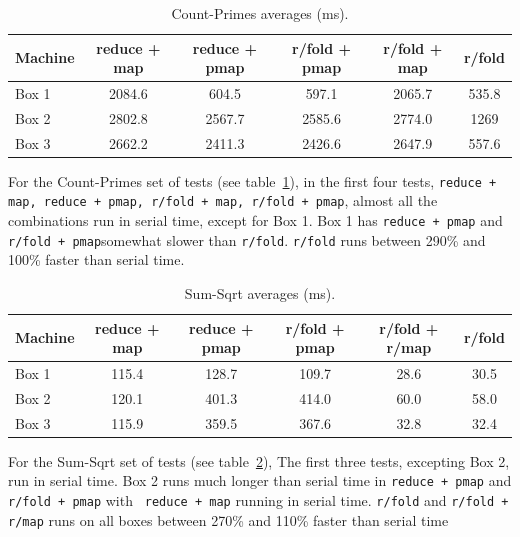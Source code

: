 \documentclass[12pt]{article}
\newcommand{\clocode}[1]{{\texttt {#1}}}
\begin{document}
\begin{table}[h!]
\begin{center}
\begin{tabular}{|l|c|c|c|c|c|}
\hline
Machine & reduce + map & reduce + pmap & r/fold + pmap & r/fold + map & r/fold\\
\hline
Box 1 & 2084.6 & 604.5 & 597.1 & 2065.7 & 535.8\\
Box 2 & 2802.8 & 2567.7 & 2585.6 & 2774.0 & 1269 \\
Box 3 & 2662.2 & 2411.3 & 2426.6 & 2647.9 & 557.6\\
\hline
\end{tabular}
\end{center}
\caption{Count-Primes averages (ms).}\label{table:count-primes}
\end{table}

For the Count-Primes set of tests (see table~\ref{table:count-primes}), in the first four tests, \clocode{reduce + map, reduce + pmap, r/fold + map, r/fold + pmap}, almost all the combinations run in serial time, except for Box 1. Box 1 has \clocode{reduce + pmap} and \clocode{r/fold + pmap}somewhat slower than \clocode{r/fold}. \clocode{r/fold} runs between 290\% and 100\% faster than serial time.


\begin{table}[h!]
\begin{center}
\begin{tabular}{|l|c|c|c|c|c|}
\hline
Machine & reduce + map & reduce + pmap & r/fold + pmap & r/fold + r/map & r/fold\\
\hline
Box 1 & 115.4 & 128.7 & 109.7 & 28.6 & 30.5\\
Box 2 & 120.1 & 401.3 & 414.0 & 60.0 & 58.0 \\
Box 3 & 115.9 & 359.5 & 367.6 & 32.8 & 32.4\\
\hline
\end{tabular}
\end{center}
\caption{Sum-Sqrt averages (ms).}\label{table:sum-sqrt}
\end{table}

For the Sum-Sqrt set of tests (see table~\ref{table:sum-sqrt}), The first three tests, excepting Box 2, run in serial time. Box 2 runs much longer than serial time in \clocode{reduce + pmap} and \clocode{ r/fold + pmap} with \clocode{ reduce + map} running in serial time. \clocode{r/fold} and \clocode{r/fold + r/map} runs on all boxes between 270\% and 110\% faster than serial time
\end{document}
